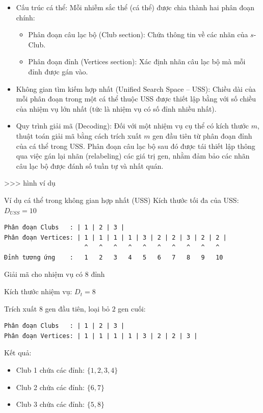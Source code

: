 \begin{itemize}
    \item{Cấu trúc cá thể:} Mỗi nhiễm sắc thể (cá thể) được chia thành hai phân đoạn chính:
    \begin{itemize}
        \item {Phân đoạn câu lạc bộ (Club section):} Chứa thông tin về các nhãn của $s$-Club.
        
        \item{Phân đoạn đỉnh (Vertices section):} Xác định nhãn câu lạc bộ mà mỗi đỉnh được gán vào.
    \end{itemize}

    \item{Không gian tìm kiếm hợp nhất (Unified Search Space -- USS):} Chiều dài của mỗi phân đoạn trong một cá thể thuộc USS được thiết lập bằng với số chiều của nhiệm vụ lớn nhất (tức là nhiệm vụ có số đỉnh nhiều nhất).

    \item{Quy trình giải mã (Decoding):} Đối với một nhiệm vụ cụ thể có kích thước $m$, thuật toán giải mã bằng cách trích xuất $m$ gen đầu tiên từ phân đoạn đỉnh của cá thể trong USS. 
    Phân đoạn câu lạc bộ sau đó được tái thiết lập thông qua việc gán lại nhãn (relabeling) các giá trị gen, nhằm đảm bảo các nhãn câu lạc bộ được đánh số tuần tự và nhất quán.
\end{itemize}
>>>  hình ví dụ

Ví dụ cá thể trong không gian hợp nhất (USS)
Kích thước tối đa của USS: $D_{USS} = 10$
\begin{verbatim}
Phân đoạn Clubs   : | 1 | 2 | 3 |
Phân đoạn Vertices: | 1 | 1 | 1 | 1 | 3 | 2 | 2 | 3 | 2 | 2 |
                      ^   ^   ^   ^   ^   ^   ^   ^   ^   ^
Đỉnh tương ứng    :   1   2   3   4   5   6   7   8   9   10
\end{verbatim}
Giải mã cho nhiệm vụ có 8 đỉnh

Kích thước nhiệm vụ: $D_{t} = 8$

Trích xuất $8$ gen đầu tiên, loại bỏ $2$ gen cuối:

\begin{verbatim}
Phân đoạn Clubs   : | 1 | 2 | 3 |
Phân đoạn Vertices: | 1 | 1 | 1 | 1 | 3 | 2 | 2 | 3 |
\end{verbatim}

Kết quả:
\begin{itemize}
    \item Club 1 chứa các đỉnh: $\{1, 2, 3, 4\}$
    \item Club 2 chứa các đỉnh: $\{6, 7\}$
    \item Club 3 chứa các đỉnh: $\{5, 8\}$
\end{itemize}

